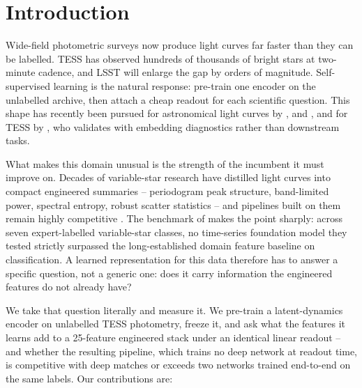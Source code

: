 \documentclass{article}
\providecommand{\DIFaddtex}[1]{{\protect\color{blue} \sf #1}} %
\providecommand{\DIFdeltex}[1]{{\protect\color{red} \scriptsize #1}} %
\providecommand{\DIFaddbegin}{} %
\providecommand{\DIFaddend}{} %
\providecommand{\DIFdelbegin}{} %
\providecommand{\DIFdelend}{} %
\providecommand{\DIFadd}[1]{\texorpdfstring{\DIFaddtex{#1}}{#1}} %
\providecommand{\DIFdel}[1]{\texorpdfstring{\DIFdeltex{#1}}{}} %
\providecommand{\DIFscaledelfig}{0.5}
\newlength{\DIFdelgraphicswidth} %
\newlength{\DIFdelgraphicsheight} %
\providecommand{\DIFaddincludegraphics}[2][]{{\color{blue}\fbox{\DIFOincludegraphics[#1]{#2}}}} %
\providecommand{\DIFdelincludegraphics}[2][]{%
\sbox{\DIFdelgraphicsbox}{\DIFOincludegraphics[#1]{#2}}%
\settoboxwidth{\DIFdelgraphicswidth}{\DIFdelgraphicsbox} %
\settoboxtotalheight{\DIFdelgraphicsheight}{\DIFdelgraphicsbox} %
\scalebox{\DIFscaledelfig}{%
\parbox[b]{\DIFdelgraphicswidth}{\usebox{\DIFdelgraphicsbox}\\[-\baselineskip] \rule{\DIFdelgraphicswidth}{0em}}\llap{\resizebox{\DIFdelgraphicswidth}{\DIFdelgraphicsheight}{%
\setlength{\unitlength}{\DIFdelgraphicswidth}%
\begin{picture}(1,1)%
\thicklines\linethickness{2pt} %
{\color[rgb]{1,0,0}\put(0,0){\framebox(1,1){}}}%
{\color[rgb]{1,0,0}\put(0,0){\line( 1,1){1}}}%
{\color[rgb]{1,0,0}\put(0,1){\line(1,-1){1}}}%
\end{picture}%
}\hspace*{3pt}}} %
} %
\DeclareRobustCommand{\DIFaddbegin}{\DIFOaddbegin \let\includegraphics\DIFaddincludegraphics} %
\DeclareRobustCommand{\DIFaddend}{\DIFOaddend \let\includegraphics\DIFOincludegraphics} %
\DeclareRobustCommand{\DIFdelbegin}{\DIFOdelbegin \let\includegraphics\DIFdelincludegraphics} %
\DeclareRobustCommand{\DIFdelend}{\DIFOaddend \let\includegraphics\DIFOincludegraphics} %
\begin{document}
\section{Introduction}

Wide-field photometric surveys now produce light curves far faster than they can be labelled. TESS
\citep{ricker2015} has observed hundreds of thousands of bright stars at two-minute cadence, and
LSST \citep{ivezic2019} will enlarge the gap by orders of magnitude. Self-supervised learning is the
natural response: pre-train one encoder on the unlabelled archive, then attach a cheap readout for
each scientific question. This shape has recently been pursued for astronomical light curves by
\citet{donoso2025astromer2}, \citet{zuo2025falco} and \citet{rui2026jepa}, and for TESS by
\citet{poznanski2026}, who validates with embedding diagnostics rather than downstream tasks.

What makes this domain unusual is the strength of the incumbent it must improve on. Decades of variable-star
research have distilled light curves into compact engineered summaries -- periodogram peak structure,
band-limited power, spectral entropy, robust scatter statistics -- and pipelines built on them remain
highly competitive \citep{audenaert2021}. The benchmark of \citet{li2025staremb} makes the point
sharply: across seven expert-labelled variable-star classes, no time-series foundation model they
tested strictly surpassed the long-established domain feature baseline on classification. A learned
representation for this data therefore has to answer a specific question, not a generic one: does it
carry information the engineered features do not already have?

We take that question literally and measure it. We pre-train a latent-dynamics encoder on unlabelled
TESS photometry, freeze it, and ask what the features it learns add to a 25-feature engineered stack under an
identical linear readout -- and whether the resulting pipeline, which trains no deep network at
readout time, \DIFdelbegin \DIFdel{is competitive with deep }\DIFdelend \DIFaddbegin \DIFadd{matches or exceeds two }\DIFaddend networks trained end-to-end on the same labels. Our
contributions are:
\end{document}
